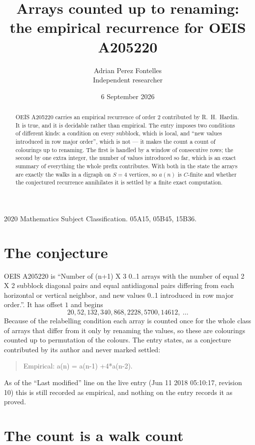 \documentclass[11pt,a4paper]{article}
\title{Arrays counted up to renaming: the empirical recurrence for OEIS A205220}
\author{Adrian Perez Fontelles\\ \small Independent researcher}
\date{6 September 2026}
\theoremstyle{plain}
\theoremstyle{definition}
\begin{document}
\maketitle

\begin{abstract}
OEIS A205220 carries an empirical recurrence of order $2$ contributed by R.~H.~Hardin. It is
true, and it is decidable rather than empirical. The entry imposes two conditions of different
kinds: a condition on every subblock, which is local, and ``new values introduced in row major
order'', which is not --- it makes the count a count of colourings up to renaming. The first is
handled by a window of consecutive rows; the second by one extra integer, the number of values
introduced so far, which is an exact summary of everything the whole prefix contributes. With
both in the state the arrays are exactly the walks in a digraph on $S=4$ vertices, so $a(n)$
is $C$-finite and whether the conjectured recurrence annihilates it is settled by a finite
exact computation.
\end{abstract}

\noindent\small 2020 Mathematics Subject Classification. 05A15, 05B45, 15B36.\normalsize

\section{The conjecture}

OEIS A205220 is ``Number of (n+1) X 3 0..1 arrays with the number of equal 2 X 2 subblock diagonal pairs and equal antidiagonal pairs differing from each horizontal or vertical neighbor, and new values 0..1 introduced in row major order.''. It has offset $1$ and begins
\[
20, 52, 132, 340, 868, 2228, 5700, 14612,\ \dots
\]
Because of the relabelling condition each array is counted once for the whole class of arrays that differ from it only by renaming the values, so these are colourings counted up to permutation of the colours.
The entry states, as a conjecture contributed by its author and never marked settled:
\begin{quote}
Empirical: a(n) = a(n-1) +4*a(n-2).
\end{quote}
As of the ``Last modified'' line on the live entry (Jun 11 2018 05:10:17, revision 10) this is still
recorded as empirical, and nothing on the entry records it as proved.

\section{The count is a walk count}
\end{document}
